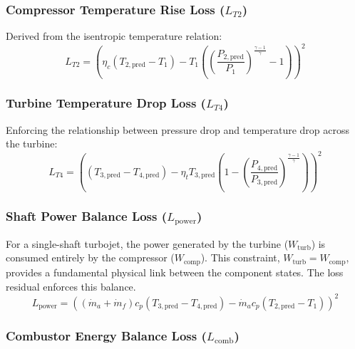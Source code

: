 \documentclass[
  12pt,
  oneside,
  a4paper,
  english,
  brazil]{abntex2}
\begin{document}
\subsubsection{\texorpdfstring{Compressor Temperature Rise Loss
(\(L_{T2}\))}{Compressor Temperature Rise Loss (L\_\{T2\})}}\label{compressor-temperature-rise-loss-l_t2}

Derived from the isentropic temperature relation: \[
L_{T2} = \left( \eta_c (T_{2,\text{pred}} - T_1) - T_1 \left( \left(\frac{P_{2,\text{pred}}}{P_1}\right)^{\frac{\gamma-1}{\gamma}} - 1 \right) \right)^2
\]

\subsubsection{\texorpdfstring{Turbine Temperature Drop Loss
(\(L_{T4}\))}{Turbine Temperature Drop Loss (L\_\{T4\})}}\label{turbine-temperature-drop-loss-l_t4}

Enforcing the relationship between pressure drop and temperature drop
across the turbine: \[
L_{T4} = \left( (T_{3,\text{pred}} - T_{4,\text{pred}}) - \eta_t T_{3,\text{pred}} \left(1 - \left(\frac{P_{4,\text{pred}}}{P_{3,\text{pred}}}\right)^{\frac{\gamma-1}{\gamma}}\right) \right)^2
\]

\subsubsection{\texorpdfstring{Shaft Power Balance Loss
(\(L_{\text{power}}\))}{Shaft Power Balance Loss (L\_\{\textbackslash text\{power\}\})}}\label{shaft-power-balance-loss-l_textpower}

For a single-shaft turbojet, the power generated by the turbine
(\(W_{\text{turb}}\)) is consumed entirely by the compressor
(\(W_{\text{comp}}\)). This constraint,
\(W_{\text{turb}} = W_{\text{comp}}\), provides a fundamental physical
link between the component states. The loss residual enforces this
balance. \[
L_{\text{power}} = \left( (\dot{m}_a + \dot{m}_f) c_p (T_{3,\text{pred}} - T_{4,\text{pred}}) - \dot{m}_a c_p (T_{2,\text{pred}} - T_1) \right)^2
\]

\subsubsection{\texorpdfstring{Combustor Energy Balance Loss
(\(L_{\text{comb}}\))}{Combustor Energy Balance Loss (L\_\{\textbackslash text\{comb\}\})}}\label{combustor-energy-balance-loss-l_textcomb}
\end{document}
